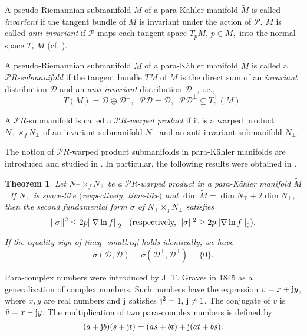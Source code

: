 \documentclass{amsart}
\theoremstyle{plain}
\newtheorem{theorem}{Theorem}[section]
\numberwithin{equation}{section}
\theoremstyle{remark}
\numberwithin{equation}{section}
\begin{document}
 A pseudo-Riemannian submanifold $M$ of a para-K\"ahler manifold $\widetilde M$ is called {\it invariant} if the tangent bundle of $M$ is invariant under the action of ${{\mathcal{P}}}$. $M$ is called {\it anti-invariant}  if ${{\mathcal{P}}}$ maps each tangent space $T_pM, \, p\in M,$ into the normal space $T_p^\perp M$ (cf. \cite{c11}).

 A pseudo-Riemannian submanifold $M$ of a para-K\"ahler manifold $\widetilde M$ is called a
\emph{${{\mathcal{P}}} R$-submanifold} if the tangent bundle $TM$ of $M$ is the direct sum of  
an \emph{invariant} distribution ${{\mathcal{D}}}$ and an
\emph{anti-invariant} distribution ${{\mathcal{D}}^\perp}$, i.e.,  $$T(M)={{\mathcal{D}}}\oplus{{\mathcal{D}}^\perp}, \;\; {{\mathcal{P}}}{{\mathcal{D}}}={{\mathcal{D}}},\;\;  {{\mathcal{P}}}{{\mathcal{D}}^\perp}\subseteq T_p^\perp(M).$$
 
A ${{\mathcal{P}}} R$-submanifold is called a \emph{${{\mathcal{P}}} R$-warped product} if it is a warped product ${{N_\top}} \times_f {N_\perp}$ of an invariant submanifold ${{N_\top}}$ and an anti-invariant submanifold ${N_\perp}$. 

The notion of ${{\mathcal{P}}} R$-warped product submanifolds in para-K\"ahler manifolds are introduced and studied in \cite{CMu12}. In particular, the following results were obtained in \cite{CMu12}.

\begin{theorem}\label{T:15.1}
\label{small_codim}
Let ${{N_\top}}\times_{f}{N_\perp}$ be a ${{\mathcal{P}}} R$-warped product in a para-K\"ahler manifold $\widetilde M$.
If ${N_\perp}$ is space-like $($respectively, time-like\/$)$ and $\dim \widetilde M= \dim {{N_\top}}+2\dim {N_\perp}$,
then the second fundamental form $\sigma$ of ${{N_\top}}\times_{f}{N_\perp}$ satisfies
\begin{equation}
\label{ineq_small:eq}
||\sigma||^{2} \leq 2p {||\nabla\ln f||}_2\;\; \hbox{ {\rm (respectively,} $||\sigma||^{2} \geq 2p {||\nabla\ln f||}_2)$}.
\end{equation}

If the equality sign of \eqref{ineq_small:eq} holds identically,  we have
\begin{equation}
\label{eq} \sigma(\mathcal D,\mathcal D)= \sigma(\mathcal D^\perp,{{\mathcal{D}}^\perp})=\{0\}.\end{equation}
\end{theorem}

Para-complex numbers were introduced by J. T. Graves in 1845 as a generalization of complex numbers. Such numbers have the expression $v=x+{{\rm j}} y$, where $x,y$ are real numbers and ${{\rm j}}$ satisfies ${{\rm j}}^{2}=1,\,{{\rm j}}\ne 1$. 
The conjugate of $v$ is $\bar v=x-{{\rm j}} y$. The multiplication of two para-complex numbers is defined by
$$(a+{{\rm j}} b)(s+{{\rm j}} t)=(as+bt)+{{\rm j}}(at+bs).$$
\end{document}
